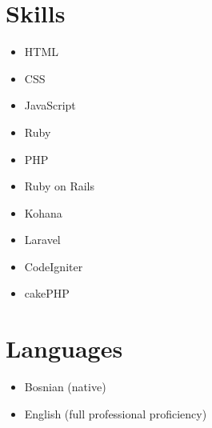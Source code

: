 \documentclass[margin]{res}
\begin{document}
\begin{resume}
\section{Skills}
\begin{itemize}[label={}, leftmargin=0cm, itemsep=0cm]
  \item HTML
  \item CSS
  \item JavaScript
  \item Ruby
  \item PHP
  \item Ruby on Rails
  \item Kohana
  \item Laravel
  \item CodeIgniter
  \item cakePHP
\end{itemize}

\section{Languages}
\begin{itemize}[label={}, leftmargin=0cm, itemsep=0cm]
  \item Bosnian (native)
  \item English (full professional proficiency)
\end{itemize}

\end{resume}
\end{document}
